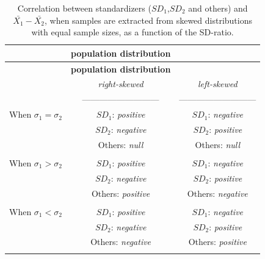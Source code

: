 \documentclass[
  man]{apa6}
\begin{document}
\begin{longtable}[]{@{}lcc@{}}
\caption{Correlation between standardizers (\(SD_1\),\(SD_2\) and others) and \(\bar{X_1}-\bar{X_2}\), when samples are extracted from skewed distributions with equal sample sizes, as a function of the SD-ratio.}\tabularnewline
\toprule
& \textbf{\textbf{population distribution}} &\tabularnewline
\midrule
\endfirsthead
\toprule
& \textbf{\textbf{population distribution}} &\tabularnewline
\midrule
\endhead
& \emph{right-skewed} & \emph{left-skewed}\tabularnewline
& --------------------------- & ---------------------------\tabularnewline
When \(\sigma_1=\sigma_2\) & \(SD_1\): \emph{positive} & \(SD_1\): \emph{negative}\tabularnewline
& \(SD_2\): \emph{negative} & \(SD_2\): \emph{positive}\tabularnewline
& Others: \emph{null} & Others: \emph{null}\tabularnewline
& &\tabularnewline
When \(\sigma_1>\sigma_2\) & \(SD_1\): \emph{positive} & \(SD_1\): \emph{negative}\tabularnewline
& \(SD_2\): \emph{negative} & \(SD_2\): \emph{positive}\tabularnewline
& Others: \emph{positive} & Others: \emph{negative}\tabularnewline
& &\tabularnewline
When \(\sigma_1<\sigma_2\) & \(SD_1\): \emph{positive} & \(SD_1\): \emph{negative}\tabularnewline
& \(SD_2\): \emph{negative} & \(SD_2\): \emph{positive}\tabularnewline
& Others: \emph{negative} & Others: \emph{positive}\tabularnewline
& &\tabularnewline
\bottomrule
\end{longtable}
\end{document}
